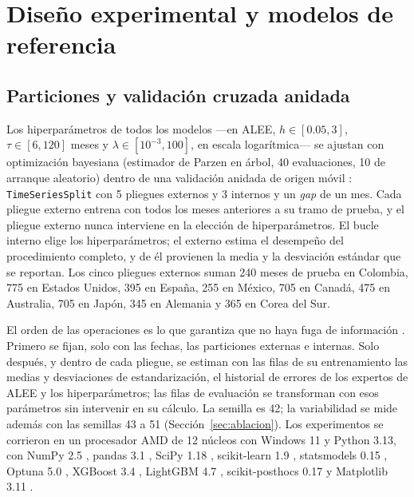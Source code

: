 \documentclass[11pt]{article}
\begin{document}
\section{Diseño experimental y modelos de referencia}
\label{sec:diseno}

\subsection{Particiones y validación cruzada anidada}
\label{sec:entrenamiento}

Los hiperparámetros de todos los modelos ---en ALEE, $h\in[0.05,3]$, $\tau\in[6,120]$ meses y $\lambda\in[10^{-3},100]$, en escala logarítmica--- se ajustan con optimización bayesiana (estimador de Parzen en árbol, 40 evaluaciones, 10 de arranque aleatorio) \cite{snoek2012,akiba2019} dentro de una validación anidada de origen móvil \cite{cerqueira2020}: \texttt{TimeSeriesSplit} con 5 pliegues externos y 3 internos y un \textit{gap} de un mes. Cada pliegue externo entrena con todos los meses anteriores a su tramo de prueba, y el pliegue externo nunca interviene en la elección de hiperparámetros. El bucle interno elige los hiperparámetros; el externo estima el desempeño del procedimiento completo, y de él provienen la media y la desviación estándar que se reportan. Los cinco pliegues externos suman 240 meses de prueba en Colombia, 775 en Estados Unidos, 395 en España, 255 en México, 705 en Canadá, 475 en Australia, 705 en Japón, 345 en Alemania y 365 en Corea del Sur.

El orden de las operaciones es lo que garantiza que no haya fuga de información \cite{kapoor2023}. Primero se fijan, solo con las fechas, las particiones externas e internas. Solo después, y dentro de cada pliegue, se estiman con las filas de su entrenamiento las medias y desviaciones de estandarización, el historial de errores de los expertos de ALEE y los hiperparámetros; las filas de evaluación se transforman con esos parámetros sin intervenir en su cálculo. La semilla es 42; la variabilidad se mide además con las semillas 43 a 51 (Sección~\ref{sec:ablacion}). Los experimentos se corrieron en un procesador AMD de 12 núcleos con Windows 11 y Python 3.13, con NumPy 2.5 \cite{harris2020}, pandas 3.1 \cite{mckinney2010}, SciPy 1.18 \cite{virtanen2020}, scikit-learn 1.9 \cite{pedregosa2011}, statsmodels 0.15 \cite{seabold2010}, Optuna 5.0 \cite{akiba2019}, XGBoost 3.4 \cite{chen2016}, LightGBM 4.7 \cite{ke2017}, scikit-posthocs 0.17 \cite{terpilowski2019} y Matplotlib 3.11 \cite{hunter2007}.
\end{document}
